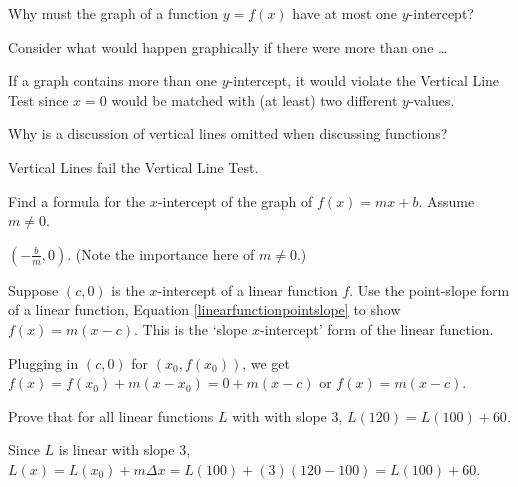\documentclass{ximera}
\begin{document}
\begin{problem}\label{onlyoneyintexercise}
Why must the graph of a function $y = f(x)$ have at most one $y$-intercept?

\begin{hint}
Consider what would happen graphically if there were more than one \ldots
\end{hint}

\begin{solution}
If a graph contains more than one $y$-intercept, it would violate the Vertical Line Test since $x=0$ would be matched with (at least) two different $y$-values.
\end{solution}
\end{problem}
 
\begin{problem}
Why is a discussion of vertical lines omitted when discussing functions?

\begin{solution}
Vertical Lines fail the Vertical Line Test.
\end{solution}
\end{problem} 

\begin{problem}\label{xinterceptoflinear}
Find a formula for the $x$-intercept of the graph of $f(x) = mx + b$.  Assume $m \neq 0$.

\begin{solution}
$\left(- \frac{b}{m}, 0 \right)$.  (Note the importance here of $m \neq 0$.)
\end{solution}
\end{problem}

\begin{problem}\label{xinterceptformoflinear}
Suppose $(c,0)$ is the $x$-intercept of a linear function $f$.  Use the point-slope form of a linear function, Equation \ref{linearfunctionpointslope} to show $f(x) = m(x-c)$.  This is the `slope $x$-intercept' form of the linear function. 

\begin{solution}
Plugging in $(c,0)$ for $(x_{0}, f(x_{0}))$, we get $f(x) = f(x_{0}) + m (x - x_{0}) = 0 + m(x-c)$ or $f(x) = m(x-c)$.
\end{solution}
\end{problem} 

\begin{problem}
Prove that for all linear functions $L$ with with slope $3$, $L(120) = L(100) + 60$.

\begin{solution}
Since $L$ is linear with slope $3$, $L(x) = L(x_{0}) + m \Delta x = L(100) + (3)(120-100) = L(100)+60$.
\end{solution}
\end{problem}
\end{document}

